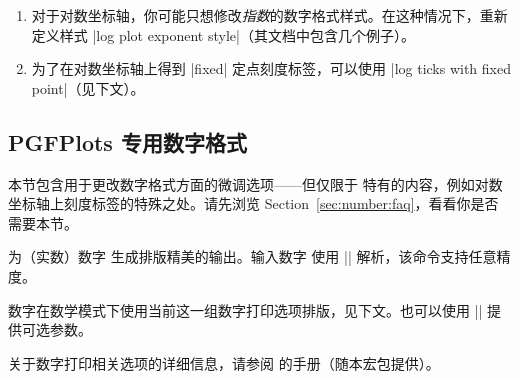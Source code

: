 \begin{enumerate}
\begin{codeexample}[]
\end{codeexample}

\begin{codeexample}[]
\end{codeexample}

\begin{codeexample}[]
\end{codeexample}
        \noindent 这些键中的每一个在 \PGFPlots{} 样式内部使用时，都需要前缀 `|/pgf/number format/|'（可以尝试 |/pgf/number format/.cd,|，以便为多个  使用相同的前缀）。

        数字排版使用 |\pgfmathprintnumber|，这是一个用于排版数字的 \pgfname{} 命令。所有受支持选项的完整参考随 \PGFPlots{} 一同提供：它记录在 \PGFPlotstable{} 的参考手册中，章节为“Number Formatting Options”。在 \pgfname{} 的文档中也可以找到相同的参考。

        请注意，数字打印机对 \PGFPlots{} \emph{一无所知}。特别是，它不负责对数及其表示。
    \item 对于对数坐标轴，你可能只想修改\emph{指数}的数字格式样式。在这种情况下，重新定义样式 |log plot exponent style|（其文档中包含几个例子）。
    \item 为了在对数坐标轴上得到 |fixed| 定点刻度标签，可以使用 |log ticks with fixed point|（见下文）。
\end{enumerate}


\subsection{PGFPlots 专用数字格式}

本节包含用于更改数字格式方面的微调选项——但仅限于 \PGFPlots{} 特有的内容，例如对数坐标轴上刻度标签的特殊之处。请先浏览 Section~\ref{sec:number:faq}，看看你是否需要本节。

\begin{command}{\pgfmathprintnumber{}}
    为（实数）数字  生成排版精美的输出。输入数字  使用 |\pgfmathfloatparsenumber| 解析，该命令支持任意精度。

    数字在数学模式下使用当前这一组数字打印选项排版，见下文。也可以使用 || 提供可选参数。

    关于数字打印相关选项的详细信息，请参阅 \PGFPlotstable{} 的手册（随本宏包提供）。
\end{command}


